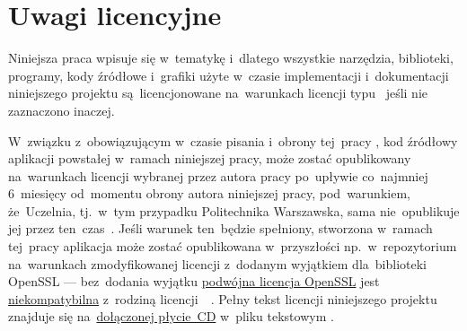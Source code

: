 \documentclass[thesis]{subfiles}
\begin{document}

\section{Uwagi licencyjne}

Niniejsza praca wpisuje się w~tematykę  i~dlatego wszystkie narzędzia, biblioteki, programy, kody źródłowe i~grafiki użyte w~czasie implementacji i~dokumentacji niniejszego projektu są~licencjonowane na~warunkach licencji typu~\emph{} jeśli nie zaznaczono inaczej.

W~związku z~obowiązującym w~czasie pisania i~obrony tej~pracy , kod źródłowy aplikacji powstałej w~ramach niniejszej pracy, może zostać opublikowany na~warunkach licencji wybranej przez autora pracy po~upływie co~najmniej 6~miesięcy od~momentu obrony autora niniejszej pracy, pod~warunkiem, że~Uczelnia, tj.~w~tym przypadku Politechnika Warszawska, sama nie~opublikuje jej przez ten~czas~\cite{papp}. Jeśli warunek ten~będzie spełniony, stworzona w~ramach tej~pracy aplikacja może zostać opublikowana w~przyszłości np.~w~repozytorium  na~warunkach zmodyfikowanej licencji  z~dodanym wyjątkiem dla~biblioteki OpenSSL --- bez~dodania wyjątku \href{https://www.openssl.org/source/license.html}{podwójna licencja OpenSSL} jest \href{https://www.openssl.org/docs/faq.html\#LEGAL2}{niekompatybilna} z~rodziną licencji~~\cite{openssl-license-incompatibility,openssl-license-incompatibility-2}. Pełny tekst licencji niniejszego projektu znajduje się na~\hyperref[ch:cd-appendix]{dołączonej płycie~CD} w~pliku tekstowym .

\end{document}
